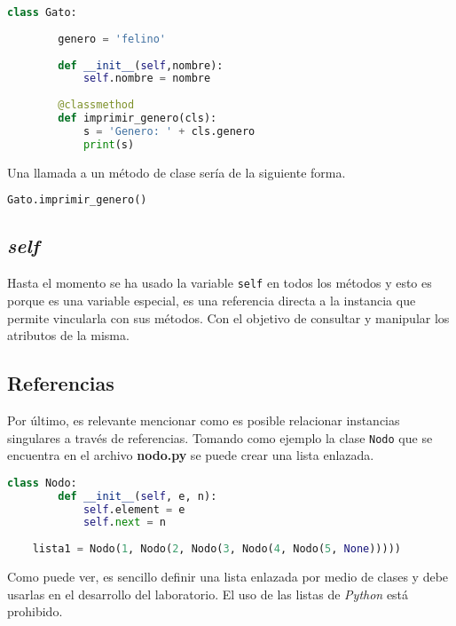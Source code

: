 \documentclass[11pt, letterpaper]{article}
\begin{document}
\begin{center}
\begin{lstlisting}[language=Python,frame=single]
    class Gato:
    
        genero = 'felino'
        
        def __init__(self,nombre):
            self.nombre = nombre
            
        @classmethod
        def imprimir_genero(cls):
            s = 'Genero: ' + cls.genero
            print(s)
\end{lstlisting}
\end{center}

Una llamada a un método de clase sería de la siguiente forma.

\begin{center}
\begin{lstlisting}[language=Python,frame=single]
    Gato.imprimir_genero()
\end{lstlisting}
\end{center}

\subsection*{\textit{self}}
Hasta el momento se ha usado la variable \texttt{self} en todos los métodos y esto es porque es una variable especial, es una referencia directa a la instancia que permite vincularla con sus métodos. Con el objetivo de consultar y manipular los atributos de la misma.

\subsection*{Referencias}
Por último, es relevante mencionar como es posible relacionar instancias singulares a través de referencias. Tomando como ejemplo la clase \texttt{Nodo} que se encuentra en el archivo \textbf{nodo.py} se puede crear una lista enlazada.

\begin{center}
\begin{lstlisting}[language=Python,frame=single]
    class Nodo:
        def __init__(self, e, n):
            self.element = e
            self.next = n
        
    lista1 = Nodo(1, Nodo(2, Nodo(3, Nodo(4, Nodo(5, None)))))
\end{lstlisting}
\end{center}

Como puede ver, es sencillo definir una lista enlazada por medio de clases y debe usarlas en el desarrollo del laboratorio. El uso de las listas de \textit{Python} está prohibido.
\end{document}
